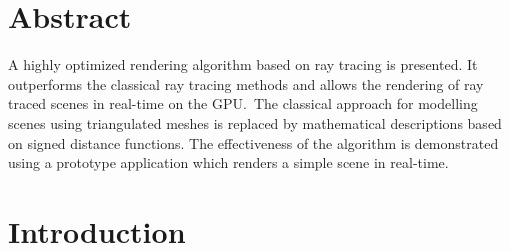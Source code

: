 \documentclass[%
    a4paper,    %
    justified,  %
    nobib,      %
    openany     %
]{tufte-book}
\makeatletter
\renewcommand{\label}[1]{\@tufte@label{##1}}%
\makeatother
\begin{document}
\chapter*{Abstract}
\label{chap:abstract}

A highly optimized rendering algorithm based on ray
tracing is presented. It outperforms the classical ray tracing methods and
allows the rendering of ray traced scenes in real-time on the GPU.~The
classical approach for modelling scenes using triangulated meshes is replaced
by mathematical descriptions based on signed distance functions. The
effectiveness of the algorithm is demonstrated using a prototype application
which renders a simple scene in real-time.


\tableofcontents{}
\listoffigures{}
\listoftables{}

\newpage{}

\chapter{Introduction}
\label{chap:introduction}
\end{document}
